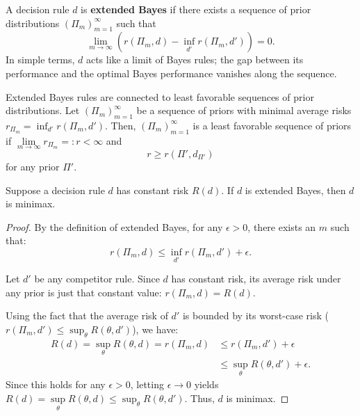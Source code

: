 \begin{definition}
\label{def:extended_bayes}
A decision rule \(d\) is \textbf{extended Bayes} if there exists a sequence of prior distributions \((\Pi_m)_{m=1}^{\infty}\) such that
\[
\lim_{m \to \infty} \left( r(\Pi_m, d) - \inf_{d'} r(\Pi_m, d') \right) = 0.
\]
In simple terms, \(d\) acts like a limit of Bayes rules; the gap between its performance and the optimal Bayes performance vanishes along the sequence.
\end{definition}

\begin{remark}[]
    Extended Bayes rules are connected to least favorable sequences of prior distributions. Let \(\left( \Pi_{m} \right) _{m=1}^{\infty}\)
 be a sequence of priors with minimal average risks \(r_{\Pi_{m}}=\inf_{d'}r(\Pi_{m},d')\). Then, \(\left( \Pi_{m} \right) ^{\infty}_{m=1}\) is
a least favorable sequence of priors if  \(\lim\limits_{m \to \infty} r_{\Pi_{m}} =: r < \infty\) and 
\[
    r \ge r(\Pi',d_{\Pi'})
\]
for any prior \(\Pi'\).
\end{remark}

\begin{lemma}
\label{lem:extended_bayes_minimax}

Suppose a decision rule \(d\) has constant risk \(R(d)\). If \(d\) is extended Bayes, then \(d\) is minimax.
\end{lemma}

\begin{proof}
    By the definition of extended Bayes, for any \(\epsilon > 0\), there exists an \(m\) such that:
    \[ r(\Pi_m, d) \le \inf_{d'} r(\Pi_m, d') + \epsilon. \]
    
    Let \(d'\) be any competitor rule. Since \(d\) has constant risk, its average risk under any prior is just that constant value: \(r(\Pi_m, d) = R(d)\).
    
    Using the fact that the average risk of \(d'\) is bounded by its worst-case risk (\(r(\Pi_m, d') \le \sup_\theta R(\theta, d')\)), we have:
    \[
    \begin{split}
        R(d) = \sup\limits_{\theta} R(\theta,d) = r(\Pi_m, d) &\le r(\Pi_m, d') + \epsilon \\
        &\le \sup_{\theta} R(\theta, d') + \epsilon.
    \end{split}
    \]
    Since this holds for any \(\epsilon > 0\), letting \(\epsilon \to 0\) yields \(R(d) = \sup\limits_{\theta} R(\theta,d)  \le \sup_{\theta} R(\theta, d')\). Thus, \(d\) is minimax.
\end{proof}



